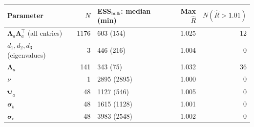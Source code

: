
\begin{tabular}{lrlrr}
\toprule
Parameter & $N$ & ESS$_\text{bulk}$: median (min) & Max $\hat R$ & $N(\hat R{>}1.01)$\\
\midrule
$\boldsymbol\Lambda_a\boldsymbol\Lambda_a^\top$ (all entries) & 1176 & 603 (154) & 1.025 & 12\\
$d_1,d_2,d_3$ (eigenvalues) & 3 & 446 (216) & 1.004 & 0\\
$\boldsymbol\Lambda_a$ & 141 & 343 (75) & 1.032 & 36\\
$\nu$ & 1 & 2895 (2895) & 1.000 & 0\\
$\boldsymbol\psi_a$ & 48 & 1127 (546) & 1.005 & 0\\
$\boldsymbol\sigma_b$ & 48 & 1615 (1128) & 1.001 & 0\\
$\boldsymbol\sigma_e$ & 48 & 3983 (2548) & 1.002 & 0\\
\bottomrule
\end{tabular}
